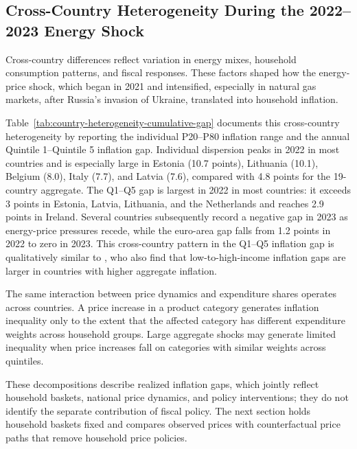 \documentclass[11pt]{article}
\begin{document}
\subsection{Cross-Country Heterogeneity During the 2022--2023 Energy Shock}


Cross-country differences reflect variation in energy mixes, household
consumption patterns, and fiscal responses. These factors shaped how the energy-price shock, which
began in 2021 and intensified, especially in natural gas markets, after Russia's invasion of
Ukraine, translated into household inflation.

Table~\ref{tab:country-heterogeneity-cumulative-gap} documents this cross-country heterogeneity by
reporting the individual P20--P80 inflation range and the annual Quintile 1--Quintile 5 inflation gap.
Individual dispersion peaks in 2022 in most countries and is especially large in Estonia (10.7 points),
Lithuania (10.1), Belgium (8.0), Italy (7.7), and Latvia (7.6), compared with 4.8 points for the
19-country aggregate.
The Q1--Q5 gap is
largest in 2022 in most countries: it exceeds 3 points in Estonia, Latvia, Lithuania, and the Netherlands and reaches
2.9 points in Ireland. Several countries subsequently record a negative gap in 2023 as energy-price
pressures recede, while the euro-area gap falls from 1.2 points in 2022 to zero in 2023. This
cross-country pattern in the Q1--Q5 inflation gap is qualitatively similar to
\citet{claeys2022inflation}, who also find that low-to-high-income inflation gaps are larger in
countries with higher aggregate inflation.

The same interaction between price dynamics and expenditure shares operates across countries. A
price increase in a product category generates inflation inequality only to
the extent that the affected category has different expenditure weights across household groups.
Large aggregate shocks may generate limited inequality when price increases fall on categories with
similar weights across quintiles.




These decompositions describe realized inflation gaps, which jointly reflect household baskets,
national price dynamics, and policy interventions; they do not identify the separate contribution
of fiscal policy. The next section holds household baskets fixed and compares observed prices with
counterfactual price paths that remove household price policies.
\end{document}
